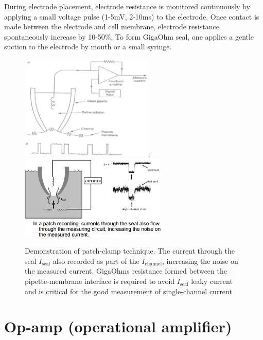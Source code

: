 During electrode placement, electrode resistance is monitored continuously by
applying a small voltage pulse (1-5mV, 2-10ms) to the electrode.
Once contact is made between the electrode and cell membrane, electrode
resistance spontaneously increase by 10-50\%.  To form GigaOhm seal, one applies
a gentle suction to the electrode by mouth or a small syringe.


\begin{figure}[htb]
  \centerline{\includegraphics[height=5cm]{./images/voltage_clamp.eps},\includegraphics[height=4cm,
    angle=0]{./images/pipete-seal-leaky.eps}}
  \caption{Demonstration of patch-clamp
  technique. The current through the seal $I_\text{seal}$ also recorded as part of
the $I_\text{channel}$, increasing the noise on the measured
current. GigaOhms resistance formed between the pipette-membrane interface is
required to avoid
$I_\text{seal}$ leaky current
and is critical for the good
measurement of single-channel
current}\label{fig:voltage-clamp-measure-channel-gating}
\label{fig:pipete-seal-leaky}
\end{figure}

\section{Op-amp (operational amplifier)}
\label{sec:op-amp}

